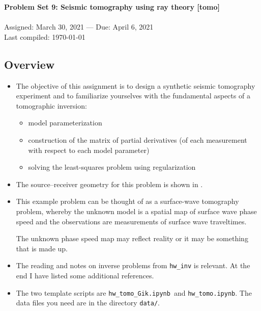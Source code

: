\documentclass[11pt,titlepage,fleqn]{article}
\newcommand{\tfiletomo}{{\tt hw\_tomo.ipynb}}
\newcommand{\tfileGik}{{\tt hw\_tomo\_Gik.ipynb}}
\begin{document}

\begin{spacing}{1.2}
\centering
{\large \bf Problem Set 9: Seismic tomography using ray theory [tomo]} \\
\cltag\ \\
Assigned: March 30, 2021 --- Due: April 6, 2021 \\
Last compiled: \today
\end{spacing}


\subsection*{Overview}

\begin{itemize}

\item The objective of this assignment is to design a synthetic seismic tomography experiment and to familiarize yourselves with the fundamental aspects of a tomographic inversion:
%
\begin{itemize}
\item model parameterization
\item construction of the matrix of partial derivatives (of each measurement with respect to each model parameter)
\item solving the least-squares problem using regularization
\end{itemize}

\item The source--receiver geometry for this problem is shown in .

\item This example problem can be thought of as a surface-wave tomography problem, whereby the unknown model is a spatial map of surface wave phase speed and the observations are measurements of surface wave traveltimes.

The unknown phase speed map may reflect reality or it may be something that is made up.

\item The reading and notes on inverse problems from \verb+hw_inv+ is relevant.
At the end I have listed some additional references.
\nocite{Tape2007,Menke,AsterE2,Tarantola2005}

\item 
The two template scripts are \tfileGik\ and \tfiletomo.
The data files you need are in the directory \verb+data/+. \\

\end{itemize}
\end{document}
